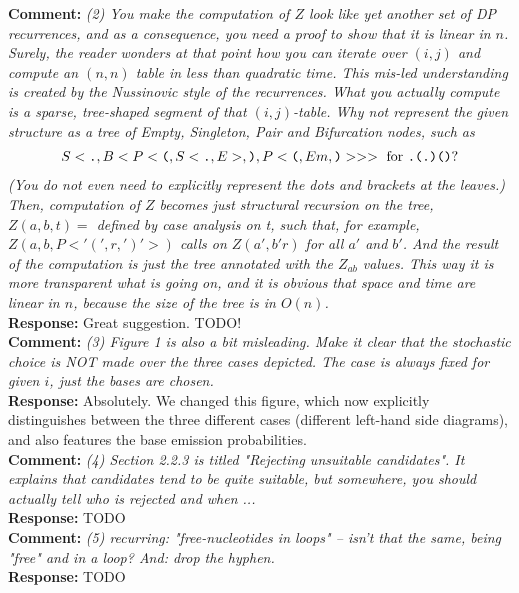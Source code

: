 \documentclass[11pt,hyperref,draft]{article} %
\newcommand{\Answer}[1]{\noindent\textsf{\textbf{Response: }}{\sf#1}\\}
\newcommand{\Comment}[1]{\noindent\textsf{\textbf{Comment: }}{\it#1}\\[.5em]}
\begin{document}
\Comment{(2) You make the computation of $Z$ look like yet another set of DP recurrences, and as a consequence, you need a proof to show that it is linear in $n$. Surely, the reader wonders at that point how you can iterate over $(i,j)$ and compute an $(n,n)$ table in less than quadratic time. This mis-led understanding is created by the Nussinovic style of the recurrences.
 What you actually compute is a sparse, tree-shaped segment of that $(i,j)$-table.
 Why not represent the given structure as a tree of Empty, Singleton, Pair and Bifurcation nodes, such as 
\begin{align*}
  S<\texttt{.},B<P<\texttt{(},S<\texttt{.},E>,\texttt{)},P<\texttt{(},Em,\texttt{)}>>> \text{ for {\tt .(.)()}}  ? 
\end{align*}
 (You do not even need to explicitly represent the dots and brackets at the leaves.)\\
 Then, computation of $Z$ becomes just structural recursion on the tree,
     $Z(a,b, t) =$ defined by case analysis on t, such that, for example,
     $Z(a,b,P<'(',r,')'>)$ calls on $Z(a',b' r)$ for all $a'$ and $b'$.
And the result of the computation is just the tree annotated with the $Z_{ab}$ values. 
This way it is more transparent what is going on, and it is obvious that space and time are linear in $n$, because the size of the tree is in $O(n)$.}
\Answer{Great suggestion. TODO!}

\Comment{(3) Figure 1 is also a bit misleading. Make it clear that the stochastic choice is NOT made over the three cases depicted. The case is always fixed for given $i$, just the bases are chosen.}
\Answer{Absolutely. We changed this figure, which now explicitly distinguishes between the three different cases (different left-hand side diagrams), and also features the base emission probabilities.}

\Comment{(4) Section 2.2.3 is titled "Rejecting unsuitable candidates". It explains that candidates tend to be quite suitable, but somewhere, you should actually tell who is rejected and when ... }
\Answer{TODO}

\Comment{(5) recurring: "free-nucleotides in loops" -- isn't that the same, being "free" and in a loop? And: drop the hyphen.}
\Answer{TODO}




\end{document}
